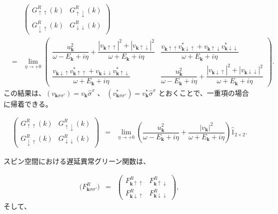 \documentclass[uplatex,a4j,12pt,dvipdfmx]{jsarticle}
\begin{document}
\begin{eqnarray}
	&&
	\left(
	\begin{array}{cc}
			G_{\uparrow \uparrow}^{R}(k)   & G_{\uparrow \downarrow}^{R}(k)   \\[3mm]
			G_{\downarrow \uparrow}^{R}(k) & G_{\downarrow \downarrow}^{R}(k)
		\end{array}
	\right)
	\nonumber \\[4mm] &=&
	\lim_{\eta \to +0}
	\left(
	\begin{array}{cc}
			\dfrac{
				u_{\bm{k}}^{2}
			}{ \omega - E_{\bm{k}} + i \eta }
			+
			\dfrac{
				|v_{\bm{k} \uparrow \uparrow}|^{2}
				+
				|v_{\bm{k} \uparrow \downarrow}|^{2}
			}{ \omega + E_{\bm{k}} + i \eta }
			 &
			\dfrac{
				v_{\bm{k} \uparrow \uparrow}
				v_{\bm{k} \downarrow \uparrow}^{*}
				+
				v_{\bm{k} \uparrow \downarrow}
				v_{\bm{k} \downarrow \downarrow}^{*}
			}{ \omega + E_{\bm{k}} + i \eta }
			\\[3mm]
			\dfrac{
				v_{\bm{k} \downarrow \uparrow}
				v_{\bm{k} \uparrow \uparrow}^{*}
				+
				v_{\bm{k} \downarrow \downarrow}
				v_{\bm{k} \uparrow \downarrow}^{*}
			}{ \omega + E_{\bm{k}} + i \eta }
			 &
			\dfrac{
				u_{\bm{k}}^{2}
			}{ \omega - E_{\bm{k}} + i \eta }
			+
			\dfrac{
				|v_{\bm{k} \downarrow \uparrow}|^{2}
				+
				|v_{\bm{k} \downarrow \downarrow}|^{2}
			}{ \omega + E_{\bm{k}} + i \eta }
		\end{array}
	\right)
	.
\end{eqnarray}
%
この結果は、$(v_{\bm{k} \sigma \sigma'}) = v_{\bm{k}} \hat{\sigma}^{x}$
、
$(v_{\bm{k} \sigma \sigma'}^{*}) = v_{\bm{k}}^{*} \hat{\sigma}^{x}$
とおくことで、一重項の場合に帰着できる。

\begin{eqnarray}
	\left(
	\begin{array}{cc}
			G_{\uparrow \uparrow}^{R}(k)   & G_{\uparrow \downarrow}^{R}(k)   \\[3mm]
			G_{\downarrow \uparrow}^{R}(k) & G_{\downarrow \downarrow}^{R}(k)
		\end{array}
	\right)
	&=&
	\lim_{\eta \to +0}
	\left(
	\dfrac{
		u_{\bm{k}}^{2}
	}{ \omega - E_{\bm{k}} + i \eta }
	+
	\dfrac{ |v_{ \bm{k} }|^{2} }{ \omega + E_{\bm{k}} + i \eta }
	\right)
	\hat{1}_{2 \times 2}
	.
\end{eqnarray}
%


スピン空間における遅延異常グリーン関数は、

\begin{eqnarray}
	\Big(
	F_{\bm{k} \sigma \sigma'}^{R}
	\Big)
	&=&
	\left(
	\begin{array}{cc}
			F_{\bm{k} \uparrow \uparrow}^{R}   & F_{\bm{k} \uparrow \downarrow}^{R}   \\[3mm]
			F_{\bm{k} \downarrow \uparrow}^{R} & F_{\bm{k} \downarrow \downarrow}^{R}
		\end{array}
	\right)
	,
\end{eqnarray}
%
そして、
\end{document}
